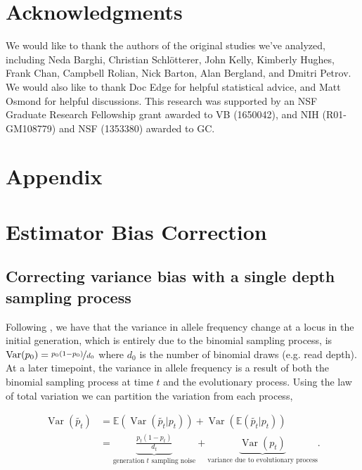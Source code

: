 \documentclass[11pt]{article}
\newcommand{\E}{\mathbb{E}}
\DeclareMathOperator{\var}{Var}
\begin{document}
\section{Acknowledgments} 

We would like to thank the authors of the original studies we've analyzed,
including Neda Barghi, Christian Schl{\"o}tterer, John Kelly, Kimberly Hughes,
Frank Chan, Campbell Rolian, Nick Barton, Alan Bergland, and Dmitri Petrov.  We
would also like to thank Doc Edge for helpful statistical advice, and Matt
Osmond for helpful discussions. This research was supported by an NSF Graduate
Research Fellowship grant awarded to VB (1650042), and NIH (R01-GM108779) and
NSF (1353380) awarded to GC.



\printbibliography


\section{Appendix}

\section{Estimator Bias Correction}
\subsection{Correcting variance bias with a single depth sampling process}
\label{supp:depth-var-corr}

Following \textcite{Waples1989-sj}, we have that the variance in allele
frequency change at a locus in the initial generation, which is entirely due to
the binomial sampling process, is $\var(p_0) = \nicefrac{p_0(1-p_0)}{d_0}$
where $d_0$ is the number of binomial draws (e.g. read depth). At a later
timepoint, the variance in allele frequency is a result of both the binomial
sampling process at time $t$ and the evolutionary process. Using the law of
total variation we can partition the variation from each process,

\begin{align}
  \var(\widetilde{p_t}) &= \E(\var(\widetilde{p_t} | p_t)) + \var(\E(\widetilde{p_t}|p_t)) \\
                        &= \underbrace{\frac{p_t(1-p_t)}{d_t}}_\text{generation $t$ sampling noise} + \underbrace{\var(p_t)}_\text{variance due to evolutionary process}.
\end{align}
\end{document}
